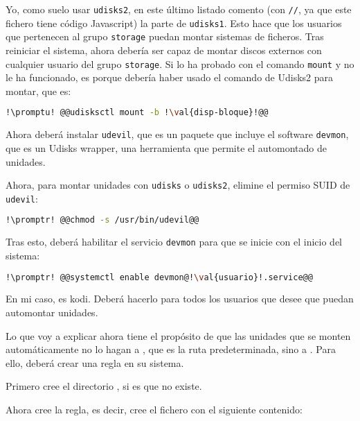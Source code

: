 \noindent Yo, como suelo usar \lstinline!udisks2!, en este último listado comento (con \lstinline+//+, ya que
este fichero tiene código Javascript) la parte de \lstinline!udisks1!. Esto hace que los usuarios que pertenecen
al grupo \texttt{storage} puedan montar sistemas de ficheros. Tras reiniciar el sistema, ahora debería ser capaz
de montar discos externos con cualquier usuario del grupo \texttt{storage}. Si lo ha probado con el comando
\lstinline!mount! y no le ha funcionado, es porque debería haber usado el comando de Udisks2 para montar, que
es:

\begin{lstlisting}[gobble=2,language=bash,style=bashinteract,escapechar=!]
  !\promptu! @@udisksctl mount -b !\val{disp-bloque}!@@
\end{lstlisting}

Ahora deberá instalar \lstinline!udevil!, que es un paquete que incluye el software \lstinline!devmon!, que es
un Udisks wrapper, una herramienta que permite el automontado de unidades.

Ahora, para montar unidades con \lstinline!udisks! o \lstinline!udisks2!, elimine el permiso SUID de
\lstinline!udevil!:

\begin{lstlisting}[gobble=2,language=bash,style=bashinteract,escapechar=!]
  !\promptr! @@chmod -s /usr/bin/udevil@@
\end{lstlisting}

\noindent Tras esto, deberá habilitar el servicio \lstinline!devmon! para que se inicie con el inicio del
sistema:

\begin{lstlisting}[gobble=2,language=bash,style=bashinteract,escapechar=!]
  !\promptr! @@systemctl enable devmon@!\val{usuario}!.service@@
\end{lstlisting}

\noindent En mi caso,  es kodi. Deberá hacerlo para todos los usuarios que desee que puedan
automontar unidades.

Lo que voy a explicar ahora tiene el propósito de que las unidades que se monten automáticamente no lo hagan a
, que es la ruta predeterminada, sino a . Para ello, deberá crear una
regla en su sistema.

Primero cree el directorio , si es que no existe.

Ahora cree la regla, es decir, cree el fichero  con el siguiente
contenido:

